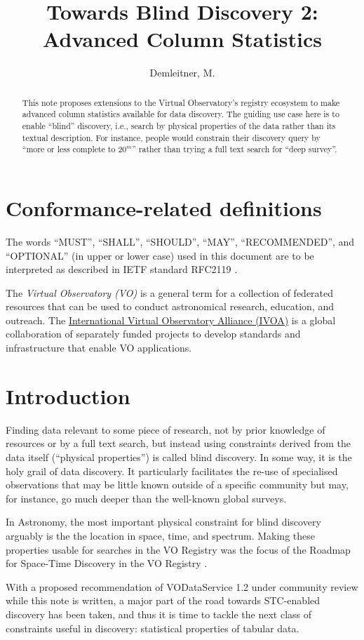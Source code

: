 \documentclass[11pt,a4paper]{ivoa}
\title{Towards Blind Discovery 2: Advanced Column Statistics}
\author[https://wiki.ivoa.net/twiki/bin/view/IVOA/MarkusDemleitner]{Demleitner, M.}
\begin{document}
\begin{abstract}
This note proposes extensions to the Virtual Observatory's registry
ecosystem to make advanced column statistics available for data
discovery.  The guiding use case here is to enable ``blind'' discovery,
i.e., search by physical properties of the data rather
than its textual description. For instance, people would constrain their
discovery query by ``more or less complete to $20^m$'' rather than
trying a full text search for ``deep survey''.
\end{abstract}


\section*{Conformance-related definitions}

The words ``MUST'', ``SHALL'', ``SHOULD'', ``MAY'', ``RECOMMENDED'', and
``OPTIONAL'' (in upper or lower case) used in this document are to be
interpreted as described in IETF standard RFC2119 \citep{std:RFC2119}.

The \emph{Virtual Observatory (VO)} is a
general term for a collection of federated resources that can be used
to conduct astronomical research, education, and outreach.
The \href{http://www.ivoa.net}{International
Virtual Observatory Alliance (IVOA)} is a global
collaboration of separately funded projects to develop standards and
infrastructure that enable VO applications.


\section{Introduction}


Finding data relevant to some piece of research, not by prior knowledge of
resources or by a full text search, but instead using constraints derived from
the data itself (“physical properties”) is called blind discovery. In some way,
it is the holy grail of data discovery. It particularly facilitates the re-use
of specialised observations that may be little known outside of a specific
community but may, for instance, go much deeper than the well-known global
surveys.

In Astronomy, the most important physical constraint for blind discovery
arguably is the the location in space, time, and spectrum.  Making these
properties usable for searches in the VO Registry was the focus of the
Roadmap for Space-Time Discovery in the VO Registry \citep{std:stcReg}.

With a proposed recommendation of VODataService 1.2 \citep{pr:VODS12}
under community review while this note is written, a major part of the
road towards STC-enabled discovery has been taken, and thus it is time
to tackle the next class of constraints useful in discovery: statistical
properties of tabular data.
\end{document}
